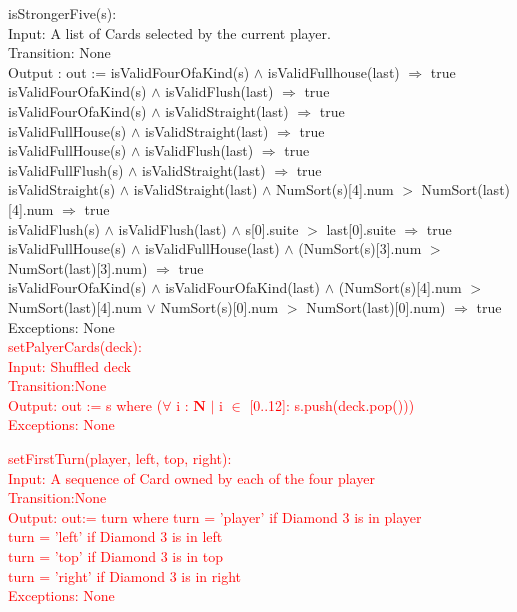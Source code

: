 \documentclass[12pt, titlepage]{article}
\begin{document}
\noindent isStrongerFive(s):\\
Input: A list of Cards selected by the current player.\\
Transition: None\\
Output : out := isValidFourOfaKind(s) $\land$ isValidFullhouse(last) $\Rightarrow$ true\\
isValidFourOfaKind(s) $\land$ isValidFlush(last) $\Rightarrow$ true\\
isValidFourOfaKind(s) $\land$ isValidStraight(last) $\Rightarrow$ true\\
isValidFullHouse(s) $\land$ isValidStraight(last) $\Rightarrow$ true\\
isValidFullHouse(s) $\land$ isValidFlush(last) $\Rightarrow$ true\\
isValidFullFlush(s) $\land$ isValidStraight(last) $\Rightarrow$ true\\
isValidStraight(s) $\land$ isValidStraight(last) $\land$ NumSort(s)[4].num $>$ NumSort(last)[4].num $\Rightarrow$ true\\
isValidFlush(s) $\land$ isValidFlush(last) $\land$ s[0].suite $>$ last[0].suite $\Rightarrow$ true\\
isValidFullHouse(s) $\land$ isValidFullHouse(last) $\land$ (NumSort(s)[3].num $>$ NumSort(last)[3].num) $\Rightarrow$ true\\
isValidFourOfaKind(s) $\land$ isValidFourOfaKind(last) $\land$ (NumSort(s)[4].num $>$ NumSort(last)[4].num $\lor$ NumSort(s)[0].num $>$ NumSort(last)[0].num) $\Rightarrow$ true\\
Exceptions: None\\

\noindent \textcolor{red}{setPalyerCards(deck):\\
Input: Shuffled deck\\
Transition:None\\
Output: out := s where ($\forall$ i : $\mathbf{N}$ $|$ i $\in$ [0..12]: s.push(deck.pop()))\\
Exceptions: None\\}

\noindent \textcolor{red}{setFirstTurn(player, left, top, right):\\
Input: A sequence of Card owned by each of the four player\\
Transition:None\\
Output: out:= turn where turn = 'player' if Diamond 3 is in player\\
turn = 'left' if Diamond 3 is in left\\
turn = 'top' if Diamond 3 is in top\\
turn = 'right' if Diamond 3 is in right\\
Exceptions: None\\}
\end{document}

